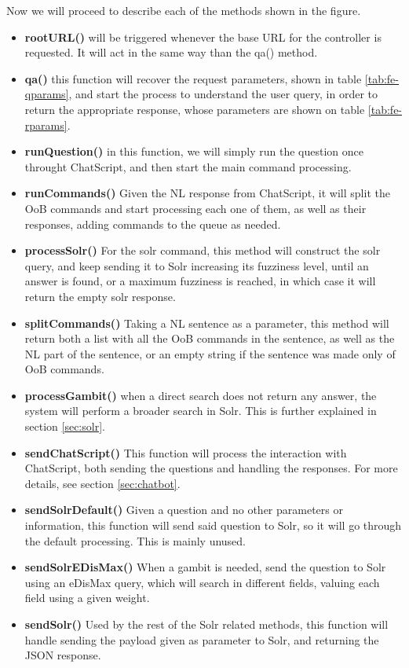 Now we will proceed to describe each of the methods shown in the figure.

\begin{itemize}
  \item \textbf{rootURL()} will be triggered whenever the base URL for the controller is requested. It will act in the same way than the qa() method.
  \item \textbf{qa()} this function will recover the request parameters, shown in table \ref{tab:fe-qparams}, and start the process to understand the user query, in order to return the appropriate response, whose parameters are shown on table \ref{tab:fe-rparams}.
  \item \textbf{runQuestion()} in this function, we will simply run the question once throught ChatScript, and then start the main command processing.
  \item \textbf{runCommands()} Given the \ac{NL} response from ChatScript, it will split the \ac{OoB} commands and start processing each one of them, as well as their responses, adding commands to the queue as needed.
  \item \textbf{processSolr()} For the solr command, this method will construct the solr query, and keep sending it to Solr increasing its fuzziness level, until an answer is found, or a maximum fuzziness is reached, in which case it will return the empty solr response.
  \item \textbf{splitCommands()} Taking a \ac{NL} sentence as a parameter, this method will return both a list with all the \ac{OoB} commands in the sentence, as well as the \ac{NL} part of the sentence, or an empty string if the sentence was made only of \ac{OoB} commands. 
  \item \textbf{processGambit()} when a direct search does not return any answer, the system will perform a broader search in Solr. This is further explained in section \ref{sec:solr}.
  \item \textbf{sendChatScript()} This function will process the interaction with ChatScript, both sending the questions and handling the responses. For more details, see section \ref{sec:chatbot}.
  \item \textbf{sendSolrDefault()} Given a question and no other parameters or information, this function will send said question to Solr, so it will go through the default processing. This is mainly unused.
  \item \textbf{sendSolrEDisMax()} When a gambit is needed, send the question to Solr using an \ac{eDisMax} query, which will search in different fields, valuing each field using a given weight. 
  \item \textbf{sendSolr()} Used by the rest of the Solr related methods, this function will handle sending the payload given as parameter to Solr, and returning the JSON response.
\end{itemize}

